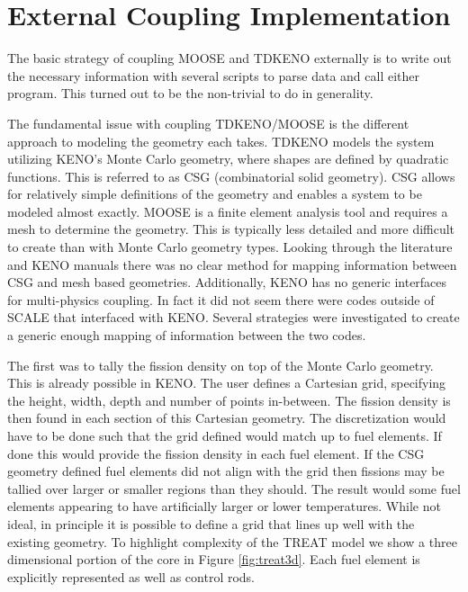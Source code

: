 \documentclass[11pt]{article}
\begin{document}
\section{External Coupling Implementation }

The basic strategy of coupling MOOSE and TDKENO externally is to write out the necessary information with several scripts to parse data and call either program. This turned out to be the non-trivial to do in generality. 

The fundamental issue with coupling TDKENO/MOOSE is the different approach to modeling the geometry each takes.  TDKENO models the system utilizing KENO's Monte Carlo geometry, where shapes are defined by quadratic functions. This is referred to as CSG (combinatorial solid geometry). CSG allows for relatively simple definitions of the geometry and enables a system to be modeled almost exactly. MOOSE is a finite element analysis tool and requires a mesh to determine the geometry.  This is typically less detailed and more difficult to create than with Monte Carlo geometry types.  Looking through the literature and KENO manuals there was no clear method for mapping information between CSG and mesh based geometries.  Additionally, KENO has no generic interfaces for multi-physics coupling.  In fact it did not seem there were codes outside of SCALE that interfaced with KENO.  Several strategies were investigated to create a generic enough mapping of information between the two codes. 

The first was to tally the fission density on top of the Monte Carlo geometry.  This is already possible in KENO.  The user defines a Cartesian grid, specifying the height, width, depth and number of points in-between.   The fission density is then found in each section of this Cartesian geometry.  The discretization would have to be done such that the grid defined would match up to fuel elements.  If done this would provide the fission density in each fuel element.  If the CSG geometry defined fuel elements did not align with the grid then fissions may be tallied over larger or smaller regions than they should.  The result would some fuel elements appearing to have artificially larger or lower temperatures.  While not ideal, in principle it is possible to define a grid that lines up well with the existing geometry.  To highlight complexity of the TREAT model we show a three dimensional portion of the core in Figure \ref{fig:treat3d}. Each fuel element is explicitly represented as well as control rods. 
\end{document}
